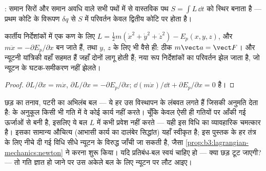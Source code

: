 \begin{omfigure}

{\small {}: समान सिरों और समान अवधि वाले सभी पथों में
से वास्तविक पथ $S = \int L\,\dd t$ को स्थिर बनाता है --- प्रथम कोटि के
विरूपण $\delta q$ से $S$ में परिवर्तन केवल द्वितीय कोटि पर होता है।}
\end{omfigure}

\begin{proposition}[न्यूटन की पुनर्प्राप्ति]\label{prop:b3:lagrangian-mechanics:newton}
कार्तीय निर्देशांकों में एक कण के लिए $L = \tfrac12 m(\dot x^2 +
\dot y^2 + \dot z^2) - E_p(x,y,z)$, और 
$m\ddot x = -\partial E_p/\partial x$ बन जाते हैं, तथा $y$, $z$ के लिए
भी वैसे ही: ठीक $m\vect a = \vect F$।  और न्यूटनी यांत्रिकी
वहाँ सहमत हैं जहाँ दोनों लागू होती हैं; नया रूप निर्देशांकों का परिवर्तन
झेल जाता है, जो न्यूटन के घटक-समीकरण नहीं झेलते।
\end{proposition}

\begin{proof}
$\partial L/\partial\dot x = m\dot x$, $\partial L/\partial x =
-\partial E_p/\partial x$; 
$\dd(m\dot x)/\dd t + \partial E_p/\partial x = 0$ है।
\end{proof}

\begin{remark}[प्रतिबंध-बल क्यों गायब हो जाते हैं]\label{rem:b3:lagrangian-mechanics:constraints}
छड़ का तनाव, पटरी का अभिलंब बल --- ये हर उस विस्थापन के लंबवत लगते हैं
जिसकी  अनुमति देता है:  के अनुकूल किसी भी गति में वे कोई
कार्य नहीं करते। चूँकि  केवल ऐसी ही गतियों पर आँकी गई ऊर्जाओं से
बनी है, इसलिए ये बल $L$ में कभी प्रवेश नहीं करते --- यही इस विधि का
व्यावहारिक चमत्कार है। इसका सामान्य औचित्य (आभासी कार्य का दालंबेर
सिद्धांत) यहाँ स्वीकृत है; इस पुस्तक के हर तंत्र के लिए नीचे दी गई विधि
सीधे न्यूटन के विरुद्ध जाँची जा सकती है, जैसा
\cref{prop:b3:lagrangian-mechanics:newton} ने करना शुरू किया। यदि
प्रतिबंध-बल स्वयं चाहिए हो --- क्या छड़ टूट जाएगी? --- तो गति ज्ञात हो
जाने पर उस अकेले बल के लिए न्यूटन पर लौट आइए।
\end{remark}


